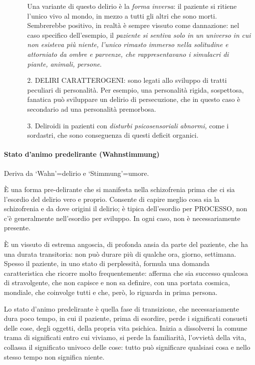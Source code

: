 \begin{itemize}
\begin{itemize}
  Una variante di questo delirio è la \emph{forma inversa}: il paziente
  si ritiene l'unico vivo al mondo, in mezzo a tutti gli altri che sono
  morti. Sembrerebbe positivo, in realtà è sempre vissuto come
  dannazione: nel caso specifico dell'esempio, il \emph{paziente si
  sentiva solo in un universo in cui non esisteva più niente, l'unico
  rimasto immerso nella solitudine e attorniato da ombre e parvenze, che
  rappresentavano i simulacri di piante, animali, persone}.
\item[2.]
  DELIRI CARATTEROGENI: sono legati allo sviluppo di tratti peculiari di
  personalità. Per esempio, una personalità rigida, sospettosa, fanatica
  può sviluppare un delirio di persecuzione, che in questo caso è
  secondario ad una personalità premorbosa.
\item[3.]
  Deliroidi in pazienti con \emph{disturbi psicosensoriali abnormi,}
  come i sordastri, che sono conseguenza di questi deficit organici.
\end{itemize}

\end{itemize}

\paragraph{Stato d'animo predelirante (Wahnstimmung)}

Deriva da `Wahn'=delirio e `Stimmung'=umore.

È una forma pre-delirante che si manifesta nella schizofrenia prima che
ci sia l'esordio del delirio vero e proprio. Consente di capire meglio
cosa sia la schizofrenia e da dove origini il delirio; è tipica
dell'esordio per PROCESSO, non c'è generalmente nell'esordio per
sviluppo. In ogni caso, non è necessariamente presente.

È un vissuto di estrema angoscia, di profonda ansia da parte del
paziente, che ha una durata transitoria: non può durare più di qualche
ora, giorno, settimana. Spesso il paziente, in uno stato di perplessità,
formula una domanda caratteristica che ricorre molto frequentemente:
afferma che sia successo qualcosa di stravolgente, che non capisce e non
sa definire, con una portata cosmica, mondiale, che coinvolge tutti e
che, però, lo riguarda in prima persona.

Lo stato d'animo predelirante è quella fase di transizione, che
necessariamente dura poco tempo, in cui il paziente, prima di esordire,
perde i significati consueti delle cose, degli oggetti, della propria
vita psichica. Inizia a dissolversi la comune trama di significati entro
cui viviamo, si perde la familiarità, l'ovvietà della vita, collassa il
significato univoco delle cose: tutto può significare qualsiasi cosa e
nello stesso tempo non significa niente.


